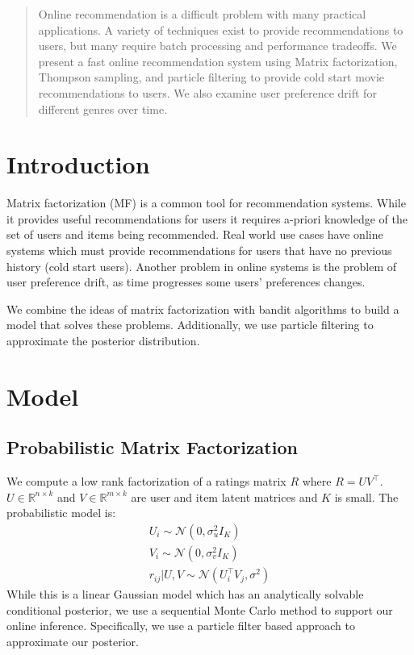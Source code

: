 \documentclass{article}
\begin{document}

\begin{abstract}
Online recommendation is a difficult problem with many practical applications. A variety of
techniques exist to provide recommendations to users, but many require batch processing
and performance tradeoffs. We present a fast online recommendation system using Matrix
factorization, Thompson sampling, and particle filtering to provide cold start
movie recommendations to users. We also examine user preference drift for different
genres over time.
\end{abstract}

\section{Introduction}
Matrix factorization (MF) is a common tool for recommendation systems. While it provides useful
recommendations for users it requires a-priori knowledge of the set of users and items being
recommended. Real world use cases have online systems which must provide recommendations for
users that have no previous history (cold start users). Another problem in online systems is
the problem of user preference drift, as time progresses some users' preferences changes.

We combine the ideas of matrix factorization with bandit algorithms \cite{zhao2013interactive} to
build a model that solves these problems. Additionally, we use particle filtering to approximate
the posterior distribution.

\section{Model}

\subsection{Probabilistic Matrix Factorization}
We compute a low rank factorization of a ratings matrix $R$ where $R = UV^\top$. $U \in \mathbb{R}^{n \times k}$
and $V \in \mathbb{R}^{m \times k}$ are user and item latent matrices and $K$ is small. The probabilistic
model is:
\begin{gather*}
U_i \sim \mathcal{N}(0, \sigma_u^2 I_K) \\
V_i \sim \mathcal{N}(0, \sigma_v^2 I_K) \\
r_{ij} | U, V \sim \mathcal{N}(U_i^\top V_j, \sigma^2)
\end{gather*}
While this is a linear Gaussian model which has an analytically solvable conditional posterior, we use a
sequential Monte Carlo method to support our online inference. Specifically, we use a particle filter
based approach to approximate our posterior.
\end{document}
